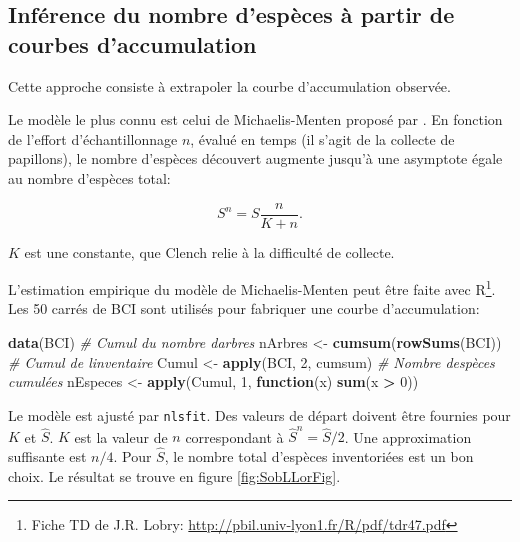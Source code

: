 \documentclass[
  11pt,
  french,
  a4paper,
  extrafontsizes,onecolumn,openright
  ]{memoir}
\newenvironment{Shaded}{\begin{snugshade}}{\end{snugshade}}
\newcommand{\CommentTok}[1]{\textcolor[rgb]{0.56,0.35,0.01}{\textit{#1}}}
\newcommand{\ControlFlowTok}[1]{\textcolor[rgb]{0.13,0.29,0.53}{\textbf{#1}}}
\newcommand{\DecValTok}[1]{\textcolor[rgb]{0.00,0.00,0.81}{#1}}
\newcommand{\FunctionTok}[1]{\textcolor[rgb]{0.13,0.29,0.53}{\textbf{#1}}}
\newcommand{\NormalTok}[1]{#1}
\newcommand{\OtherTok}[1]{\textcolor[rgb]{0.56,0.35,0.01}{#1}}
\newcommand{\SpecialCharTok}[1]{\textcolor[rgb]{0.81,0.36,0.00}{\textbf{#1}}}
\begin{document}
\normalsize

\subsection{Inférence du nombre d'espèces à partir de courbes d'accumulation}\label{sec-RichesseSAC}

Cette approche consiste à extrapoler la courbe d'accumulation observée.

Le modèle le plus connu est celui de Michaelis-Menten \autocite{Michaelis1913} proposé par \textcite{Clench1979}.
En fonction de l'effort d'échantillonnage \(n\), évalué en temps (il s'agit de la collecte de papillons), le nombre d'espèces découvert augmente jusqu'à une asymptote égale au nombre d'espèces total:

\begin{equation} 
  S^{n} = S\frac{n}{K+n}.
\end{equation}

\(K\) est une constante, que Clench relie à la difficulté de collecte.

L'estimation empirique du modèle de Michaelis-Menten peut être faite avec R\footnote{ Fiche TD de J.R. Lobry: \url{http://pbil.univ-lyon1.fr/R/pdf/tdr47.pdf}}.
Les 50 carrés de BCI sont utilisés pour fabriquer une courbe d'accumulation:

\scriptsize

\begin{Shaded}
\begin{Highlighting}[]
\FunctionTok{data}\NormalTok{(BCI)}
\CommentTok{\# Cumul du nombre d\textquotesingle{}arbres}
\NormalTok{nArbres }\OtherTok{\textless{}{-}} \FunctionTok{cumsum}\NormalTok{(}\FunctionTok{rowSums}\NormalTok{(BCI))}
\CommentTok{\# Cumul de l\textquotesingle{}inventaire}
\NormalTok{Cumul }\OtherTok{\textless{}{-}} \FunctionTok{apply}\NormalTok{(BCI, }\DecValTok{2}\NormalTok{, cumsum)}
\CommentTok{\# Nombre d\textquotesingle{}espèces cumulées}
\NormalTok{nEspeces }\OtherTok{\textless{}{-}} \FunctionTok{apply}\NormalTok{(Cumul, }\DecValTok{1}\NormalTok{, }\ControlFlowTok{function}\NormalTok{(x) }\FunctionTok{sum}\NormalTok{(x }\SpecialCharTok{\textgreater{}} \DecValTok{0}\NormalTok{))}
\end{Highlighting}
\end{Shaded}

\normalsize

Le modèle est ajusté par \texttt{nlsfit}.
Des valeurs de départ doivent être fournies pour \(K\) et \(\hat{S}\).
\(K\) est la valeur de \(n\) correspondant à \(\hat{S}^{n} =\hat{S}/2\).
Une approximation suffisante est \(n/4\).
Pour \(\hat{S}\), le nombre total d'espèces inventoriées est un bon choix.
Le résultat se trouve en figure \ref{fig:SobLLorFig}.
\end{document}
